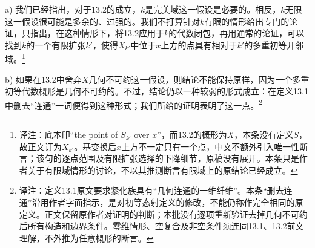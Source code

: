 \documentclass[openany,fontset=fandol]{ctexbook}
\newcommand{\note}[1]{\footnote{译注：#1}}
\begin{document}
\noindent a) 我们已经指出，对于13.2的成立，$k$是完美域这一假设是必要的。相反，$k$无限这一假设很可能是多余的、过强的。我们不打算针对$k$有限的情形给出专门的论证，只指出，在这种情形下，将13.2应用于$k$的代数闭包，再用通常的论证，可以找到$k$的一个有限扩张$k'$，使得$X_{k'}$中位于$x$上方的点具有相对于$k'$的多重初等开邻域。\note{底本印“the point of $S_{k'}$ over $x$”，而13.2的概形为$X$，本条没有定义$S$，故正文订为$X_{k'}$。基变换后$x$上方不一定只有一个点，中文不额外引入唯一性断言；该句的逐点范围及有限扩张选择的下降细节，原稿没有展开。本条只是作者关于有限域情形的讨论，不以其推测断言有限域上的原结论已经成立。}

\noindent b) 如果在13.2中舍弃$X$几何不可约这一假设，则结论不能保持原样，因为一个多重初等代数概形是几何不可约的。不过，结论仍以一种较弱的形式成立：在定义13.1中删去“连通”一词便得到这种形式；我们所给的证明表明了这一点。\note{定义13.1原文要求紧化族具有“几何连通的一维纤维”。本条“删去连通”沿用作者字面指示，是对初等态射定义的修改，不能仍称作完全相同的原定义。正文保留原作者对证明的判断；本批没有逐项重新验证去掉几何不可约后所有构造和边界条件。零维情形、空复合及非空条件须连同13.1、13.2前文理解，不外推为任意概形的断言。}
\end{document}
